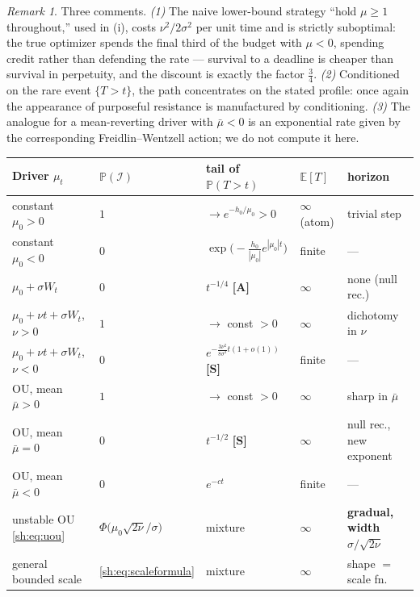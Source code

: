 \documentclass[11pt]{article}
\numberwithin{equation}{section}
\theoremstyle{plain}
\theoremstyle{definition}
\theoremstyle{remark}
\newtheorem{remark}[theorem]{Remark}
\newcommand{\E}{\mathbb{E}}
\newcommand{\PP}{\mathbb{P}}
\newcommand{\Imm}{\mathcal{I}}
\begin{document}
\begin{remark}\label{sh:rem:advdrift}
Three comments. \emph{(1)} The naive lower-bound strategy ``hold
$\mu\ge1$ throughout,'' used in (i), costs $\nu^2/2\sigma^2$ per unit time
and is strictly suboptimal: the true optimizer spends the final third of
the budget with $\mu<0$, spending credit rather than defending the rate ---
survival to a deadline is cheaper than survival in perpetuity, and the
discount is exactly the factor $\tfrac34$. \emph{(2)} Conditioned on the
rare event $\{T>t\}$, the path concentrates on the stated profile: once
again the appearance of purposeful resistance is manufactured by
conditioning. \emph{(3)} The analogue for a mean-reverting driver with
$\bar\mu<0$ is an exponential rate given by the corresponding
Freidlin--Wentzell action; we do not compute it here.
\end{remark}

\begin{center}
\small
\begin{tabular}{@{}lllll@{}}
\toprule
\textbf{Driver} $\mu_t$ & $\PP(\Imm)$ & \textbf{tail of }$\PP(T>t)$ &
$\E[T]$ & \textbf{horizon}\\
\midrule
constant $\mu_0>0$ & $1$ & $\to e^{-h_0/\mu_0}>0$ & $\infty$ (atom) &
trivial step\\
constant $\mu_0<0$ & $0$ & $\exp\bigl(-\tfrac{h_0}{|\mu_0|}
e^{|\mu_0|t}\bigr)$ & finite & ---\\
$\mu_0+\sigma W_t$ & $0$ & $t^{-1/4}$ \textbf{[A]} & $\infty$ & none
(null rec.)\\
$\mu_0+\nu t+\sigma W_t$, $\nu>0$ & $1$ & $\to$ const $>0$ & $\infty$ &
dichotomy in $\nu$\\
$\mu_0+\nu t+\sigma W_t$, $\nu<0$ & $0$ &
$e^{-\frac{3\nu^2}{8\sigma^2}t(1+o(1))}$ \textbf{[S]} & finite & ---\\
OU, mean $\bar\mu>0$ & $1$ & $\to$ const $>0$ & $\infty$ & sharp in
$\bar\mu$\\
OU, mean $\bar\mu=0$ & $0$ & $t^{-1/2}$ \textbf{[S]} & $\infty$ & null
rec., new exponent\\
OU, mean $\bar\mu<0$ & $0$ & $e^{-ct}$ & finite & ---\\
unstable OU \eqref{sh:eq:uou} & $\Phi\bigl(\mu_0\sqrt{2\nu}/\sigma\bigr)$
& mixture & $\infty$ & \textbf{gradual, width }$\sigma/\sqrt{2\nu}$\\
general bounded scale & \eqref{sh:eq:scaleformula} & mixture & $\infty$ &
shape $=$ scale fn.\\
\bottomrule
\end{tabular}
\end{center}
\end{document}

